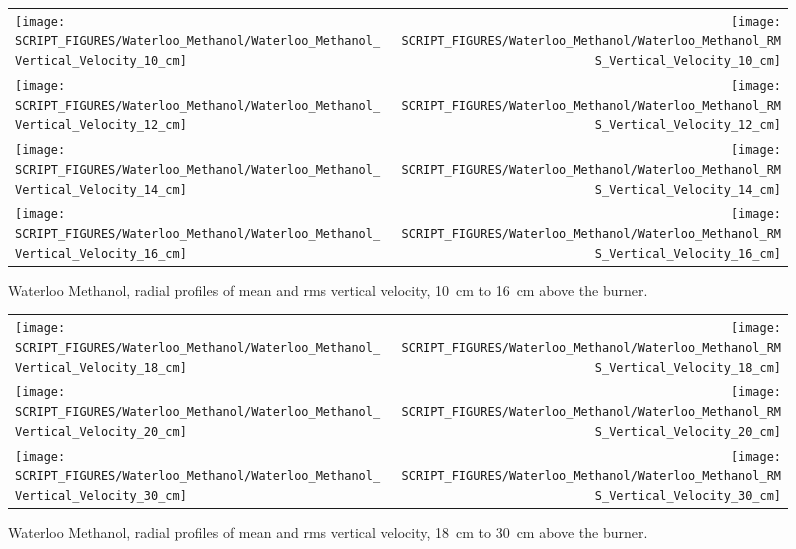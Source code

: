 \begin{figure}[p]
\begin{tabular*}{\textwidth}{l@{\extracolsep{\fill}}r}
\texttt{[image: SCRIPT\_FIGURES/Waterloo\_Methanol/Waterloo\_Methanol\_Vertical\_Velocity\_10\_cm]} &
\texttt{[image: SCRIPT\_FIGURES/Waterloo\_Methanol/Waterloo\_Methanol\_RMS\_Vertical\_Velocity\_10\_cm]} \\
\texttt{[image: SCRIPT\_FIGURES/Waterloo\_Methanol/Waterloo\_Methanol\_Vertical\_Velocity\_12\_cm]} &
\texttt{[image: SCRIPT\_FIGURES/Waterloo\_Methanol/Waterloo\_Methanol\_RMS\_Vertical\_Velocity\_12\_cm]} \\
\texttt{[image: SCRIPT\_FIGURES/Waterloo\_Methanol/Waterloo\_Methanol\_Vertical\_Velocity\_14\_cm]} &
\texttt{[image: SCRIPT\_FIGURES/Waterloo\_Methanol/Waterloo\_Methanol\_RMS\_Vertical\_Velocity\_14\_cm]} \\
\texttt{[image: SCRIPT\_FIGURES/Waterloo\_Methanol/Waterloo\_Methanol\_Vertical\_Velocity\_16\_cm]} &
\texttt{[image: SCRIPT\_FIGURES/Waterloo\_Methanol/Waterloo\_Methanol\_RMS\_Vertical\_Velocity\_16\_cm]}
\end{tabular*}
\caption[Waterloo Methanol, radial mean and rms vert.~vel., 10~cm to 16~cm above burner]
{Waterloo Methanol, radial profiles of mean and rms vertical velocity, 10~cm to 16~cm above the burner.}
\label{Water_Methanol_Vert_Vel_2}
\end{figure}

\begin{figure}[p]
\begin{tabular*}{\textwidth}{l@{\extracolsep{\fill}}r}
\texttt{[image: SCRIPT\_FIGURES/Waterloo\_Methanol/Waterloo\_Methanol\_Vertical\_Velocity\_18\_cm]} &
\texttt{[image: SCRIPT\_FIGURES/Waterloo\_Methanol/Waterloo\_Methanol\_RMS\_Vertical\_Velocity\_18\_cm]} \\
\texttt{[image: SCRIPT\_FIGURES/Waterloo\_Methanol/Waterloo\_Methanol\_Vertical\_Velocity\_20\_cm]} &
\texttt{[image: SCRIPT\_FIGURES/Waterloo\_Methanol/Waterloo\_Methanol\_RMS\_Vertical\_Velocity\_20\_cm]} \\
\texttt{[image: SCRIPT\_FIGURES/Waterloo\_Methanol/Waterloo\_Methanol\_Vertical\_Velocity\_30\_cm]} &
\texttt{[image: SCRIPT\_FIGURES/Waterloo\_Methanol/Waterloo\_Methanol\_RMS\_Vertical\_Velocity\_30\_cm]}
\end{tabular*}
\caption[Waterloo Methanol, radial mean and rms vert.~vel., 18~cm to 30~cm above burner]
{Waterloo Methanol, radial profiles of mean and rms vertical velocity, 18~cm to 30~cm above the burner.}
\label{Water_Methanol_Vert_Vel_3}
\end{figure}


